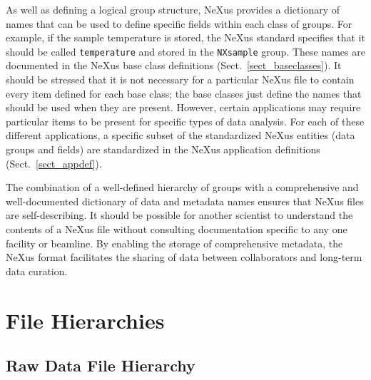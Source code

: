\documentclass[%
 aip,
rsi,
 amsmath,amssymb,
 reprint,%
]{revtex4-1}
\begin{document}
As well as defining a logical group structure, NeXus provides a dictionary of names that can be used to define specific fields within each class of
groups. For example, if the sample temperature is stored, the NeXus standard specifies that it should be called \texttt{temperature} and stored in
the \texttt{NXsample} group. These names are documented in the NeXus base class definitions (Sect.~\ref{sect_baseclasses}). It should be stressed that
it is not necessary for a particular NeXus file to contain every item defined for each base class; the base classes just define the names that should be
used when they are present. However, certain applications may require particular
items to be present for specific types of data analysis. For each of these different applications, a specific subset of the standardized NeXus entities 
(data groups and fields) are standardized in the NeXus application definitions (Sect.~\ref{sect_appdef}).

The combination of a well-defined hierarchy of groups with a comprehensive and well-documented dictionary of data and metadata names ensures
that NeXus files are self-describing. It should be possible for another scientist to understand the contents of a NeXus file without consulting 
documentation specific to any one facility or beamline. By enabling the storage of comprehensive metadata, the NeXus format facilitates the 
sharing of data between collaborators and long-term data curation. 

\section{File Hierarchies}

\subsection{Raw Data File Hierarchy}
\end{document}
